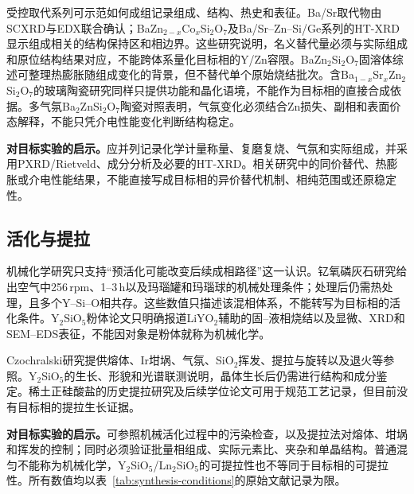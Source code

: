 受控取代系列可示范如何成组记录组成、结构、热史和表征。Ba/Sr取代物由SCXRD与EDX联合确认；BaZn$_{2-x}$Co$_x$Si$_2$O$_7$及Ba/Sr--Zn--Si/Ge系列的HT-XRD显示组成相关的结构保持区和相边界。这些研究说明，名义替代量必须与实际组成和原位结构结果对应，不能跨体系量化目标相的Y/Zn容限\cite{thieme2015ba1,kerstan2013bazn2si2o7,thieme2016negative}。BaZn$_2$Si$_2$O$_7$固溶体综述可整理热膨胀随组成变化的背景，但不替代单个原始烧结批次\cite{thieme2022solid}。含Ba$_{1-x}$Sr$_x$Zn$_2$Si$_2$O$_7$的玻璃陶瓷研究同样只提供功能和晶化语境，不能作为目标相的直接合成依据\cite{thieme2017variable}。多气氛Ba$_2$ZnSi$_2$O$_7$陶瓷对照表明，气氛变化必须结合Zn损失、副相和表面价态解释，不能只凭介电性能变化判断结构稳定\cite{zou2019anti}。

\textbf{对目标实验的启示。}应并列记录化学计量称量、复磨复烧、气氛和实际组成，并采用PXRD/Rietveld、成分分析及必要的HT-XRD。相关研究中的同价替代、热膨胀或介电性能结果，不能直接写成目标相的异价替代机制、相纯范围或还原稳定性。

\subsection{活化与提拉}

机械化学研究只支持“预活化可能改变后续成相路径”这一认识。钇氧磷灰石研究给出空气中256\,rpm、1--3\,h以及玛瑙罐和玛瑙球的机械处理条件；处理后仍需热处理，且多个Y--Si--O相共存。这些数值只描述该混相体系，不能转写为目标相的活化条件\cite{tzvetkov2001effects}。Y$_2$SiO$_5$粉体论文只明确报道LiYO$_2$辅助的固--液相烧结以及显微、XRD和SEM--EDS表征，不能因对象是粉体就称为机械化学\cite{yldrm2009y2sio5}。

Czochralski研究提供熔体、Ir坩埚、气氛、SiO$_2$挥发、提拉与旋转以及退火等参照。Y$_2$SiO$_5$的生长、形貌和光谱联测说明，晶体生长后仍需进行结构和成分鉴定。稀土正硅酸盐的历史提拉研究及后续学位论文可用于规范工艺记录，但目前没有目标相的提拉生长证据\cite{pang2005study,shoudu1999czochralski,brandle1986czochralski,alizadeh2021spectroscopy}。

\textbf{对目标实验的启示。}可参照机械活化过程中的污染检查，以及提拉法对熔体、坩埚和挥发的控制；同时必须验证批量相组成、实际元素比、夹杂和单晶结构。普通混匀不能称为机械化学，Y$_2$SiO$_5$/Ln$_2$SiO$_5$的可提拉性也不等同于目标相的可提拉性。所有数值均以表~\ref{tab:synthesis-conditions}的原始文献记录为限。
